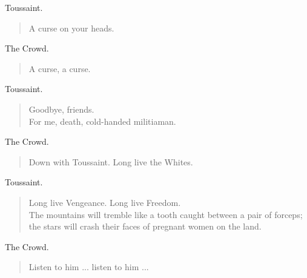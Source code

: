 \documentclass[letterpaper,article,12pt,oneside,notitlepage]{memoir}
\begin{document}
\begin{center}Toussaint.\end{center}

\begin{verse}
\hspace{1cm} A curse on your heads. \\
\end{verse}

\begin{center}The Crowd.\end{center}

\begin{verse}
A curse, a curse. \\
\end{verse}

\begin{center}Toussaint.\end{center}

\begin{verse}
\hspace{1cm} Goodbye, friends. \\
For me, death, cold-handed militiaman. \\
\end{verse}

\begin{center}The Crowd.\end{center}

\begin{verse}
\hspace{1cm} Down with Toussaint. Long live the Whites. \\
\end{verse}

\begin{center}Toussaint.\end{center}

\begin{verse}
\hspace{1cm} Long live Vengeance. Long live Freedom. \\
The mountains will tremble like a tooth caught between a pair of forceps; the stars will crash their faces of pregnant women on the land. \\
\end{verse}

\begin{center}The Crowd.\end{center}

\begin{verse}
\hspace{1cm} Listen to him ... listen to him ... \\
\end{verse}
\end{document}
